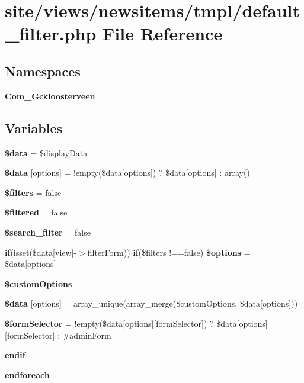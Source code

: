 \section{site/views/newsitems/tmpl/default\+\_\+filter.php File Reference}
\label{newsitems_2tmpl_2default__filter_8php}
\subsection*{Namespaces}
\begin{DoxyCompactItemize}
\item 
 \textbf{ Com\+\_\+\+Gckloosterveen}
\end{DoxyCompactItemize}
\subsection*{Variables}
\begin{DoxyCompactItemize}
\item 
\textbf{ \$data} = \$display\+Data
\item 
\textbf{ \$data} [\textquotesingle{}options\textquotesingle{}] = !empty(\$data[\textquotesingle{}options\textquotesingle{}]) ? \$data[\textquotesingle{}options\textquotesingle{}] \+: array()
\item 
\textbf{ \$filters} = false
\item 
\textbf{ \$filtered} = false
\item 
\textbf{ \$search\+\_\+filter} = false
\item 
\textbf{ if}(isset(\$data[\textquotesingle{}view\textquotesingle{}]-\/$>$filter\+Form)) \textbf{ if}(\$filters !==false) \textbf{ \$options} = \$data[\textquotesingle{}options\textquotesingle{}]
\item 
\textbf{ \$custom\+Options}
\item 
\textbf{ \$data} [\textquotesingle{}options\textquotesingle{}] = array\+\_\+unique(array\+\_\+merge(\$custom\+Options, \$data[\textquotesingle{}options\textquotesingle{}]))
\item 
\textbf{ \$form\+Selector} = !empty(\$data[\textquotesingle{}options\textquotesingle{}][\textquotesingle{}form\+Selector\textquotesingle{}]) ? \$data[\textquotesingle{}options\textquotesingle{}][\textquotesingle{}form\+Selector\textquotesingle{}] \+: \textquotesingle{}\#admin\+Form\textquotesingle{}
\item 
\textbf{ endif}
\item 
\textbf{ endforeach}
\end{DoxyCompactItemize}


